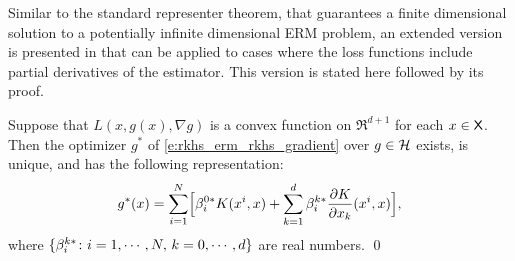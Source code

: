 Similar to the standard representer theorem, that guarantees a finite dimensional solution to a potentially infinite dimensional ERM problem, an extended version is presented in \cite{zho08} that can be applied to cases where the loss functions include partial derivatives of the estimator. This version is stated here followed by its proof. 
\begin{theorem}
	\label{theorem:ext_rep_theorem}
	Suppose that $L(x, g(x),\nabla g)$ is a convex function on $\Re^{d+1}$ for each $x\in{\sf X}$.
	Then the  optimizer $g^*$ of \eqref{e:rkhs_erm_rkhs_gradient} over $g\in{\cal H}$ exists, is unique, and has the following representation: %
	\begin{equation}
	g^*(x) = \sum_{i=1}^N  \Bigl[
	\rkhsparam_i^{0*}  K(x^i,x)   +  \sum_{k =1}^d  \rkhsparam_i^{k*} \frac{\partial K}{\partial x_k} (x^i, x) \Bigr],
	\label{e:rkhs_ext_rep_theorem}
	\end{equation}
	where $\{\beta_i^{k*} \colon i=1,\cdots,N,\, k = 0,\cdots,d\}$ are real numbers.
	\qed
\end{theorem}
